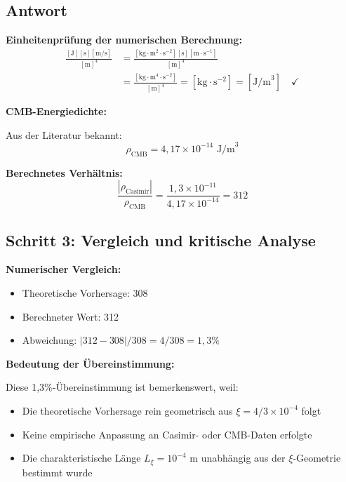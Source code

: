 \documentclass[12pt,a4paper]{article}
\theoremstyle{remark}
\newenvironment{answer}{\subsection*{Antwort}}{\vspace{1em}}
\begin{document}
\begin{answer}
	\begin{units}
		\textbf{Einheitenprüfung der numerischen Berechnung:}
		\begin{align}
			\frac{[\text{J}][\text{s}][\text{m/s}]}{[\text{m}]^4} &= \frac{[\text{kg}\cdot\text{m}^2\cdot\text{s}^{-2}][\text{s}][\text{m}\cdot\text{s}^{-1}]}{[\text{m}]^4} \\
			&= \frac{[\text{kg}\cdot\text{m}^4\cdot\text{s}^{-2}]}{[\text{m}]^4} = [\text{kg}\cdot\text{s}^{-2}] = [\text{J/m}^3] \quad \checkmark
		\end{align}
	\end{units}
	
	\textbf{CMB-Energiedichte:}
	
	Aus der Literatur bekannt:
	\begin{equation}
		\rho_{\text{CMB}} = 4{,}17 \times 10^{-14} \text{ J/m}^3
	\end{equation}
	
	\textbf{Berechnetes Verhältnis:}
	\begin{equation}
		\frac{|\rho_{\text{Casimir}}|}{\rho_{\text{CMB}}} = \frac{1{,}3 \times 10^{-11}}{4{,}17 \times 10^{-14}} = 312
	\end{equation}
	
	\subsection{Schritt 3: Vergleich und kritische Analyse}
	
	\textbf{Numerischer Vergleich:}
	\begin{itemize}
		\item Theoretische Vorhersage: 308
		\item Berechneter Wert: 312
		\item Abweichung: $|312 - 308|/308 = 4/308 = 1{,}3\%$
	\end{itemize}
	
	\textbf{Bedeutung der Übereinstimmung:}
	
	Diese 1{,}3\%-Übereinstimmung ist bemerkenswert, weil:
	\begin{itemize}
		\item Die theoretische Vorhersage rein geometrisch aus $\xi = 4/3 \times 10^{-4}$ folgt
		\item Keine empirische Anpassung an Casimir- oder CMB-Daten erfolgte
		\item Die charakteristische Länge $L_\xi = 10^{-4}$ m unabhängig aus der $\xi$-Geometrie bestimmt wurde
	\end{itemize}
	

\end{answer}
\end{document}
